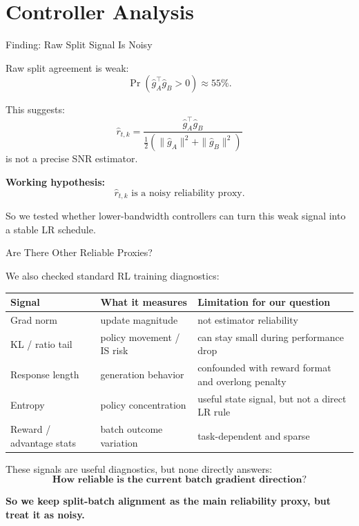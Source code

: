 \documentclass[aspectratio=169]{beamer}
\begin{document}
\section{Controller Analysis}

\begin{frame}{Finding: Raw Split Signal Is Noisy}
\small

Raw split agreement is weak:
\[
  \Pr(\hat g_A^\top \hat g_B>0)\approx 55\%.
\]

\vspace{0.7em}

This suggests:
\[
  \hat r_{t,k}
  =
  \frac{\hat g_A^\top \hat g_B}
       {\frac12(\|\hat g_A\|^2+\|\hat g_B\|^2)}
\]
is not a precise SNR estimator.

\vspace{0.8em}

\textbf{Working hypothesis:}
\[
  \hat r_{t,k}
  \text{ is a noisy reliability proxy.}
\]

\vspace{0.8em}

So we tested whether lower-bandwidth controllers can turn this weak signal into a stable LR schedule.

\end{frame}


\begin{frame}{Are There Other Reliable Proxies?}
\small

We also checked standard RL training diagnostics:

\vspace{0.4em}

\begin{center}
\scriptsize
\begin{tabular}{lll}
\toprule
Signal & What it measures & Limitation for our question \\
\midrule
Grad norm & update magnitude & not estimator reliability \\
KL / ratio tail & policy movement / IS risk & can stay small during performance drop \\
Response length & generation behavior & confounded with reward format and overlong penalty \\
Entropy & policy concentration & useful state signal, but not a direct LR rule \\
Reward / advantage stats & batch outcome variation & task-dependent and sparse \\
\bottomrule
\end{tabular}
\end{center}

\vspace{0.7em}

These signals are useful diagnostics, but none directly answers:
\[
  \textbf{How reliable is the current batch gradient direction?}
\]


\large
\textbf{So we keep split-batch alignment as the main reliability proxy, but treat it as noisy.}

\end{frame}
\end{document}
